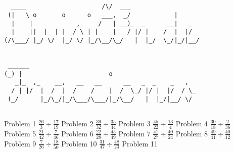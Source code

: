 \documentclass{article}
\begin{document}
\begin{verbatim}


  ____                     /\/  ___
 (|   \ o       o      o   ___,  _/            |
  |    |            ,     /   | __)_  _      __|   _
 _|    ||  |  |_|  / \_| |    |   / |/ |    /  |  |/
(/\___/ |_/ \/  |_/ \/ |_/\__/\_/   |  |_/  \_/|_/|__/


 ______
(_) |                        o
   _|_  ,_    __,   __   __      __   _  _    _   ,
  / | |/  |  /  |  /    /    |  /  \_/ |/ |  |/  / \_
 (_/      |_/\_/|_/\___/\___/|_/\__/   |  |_/|__/ \/
 

\end{verbatim}

Problem 1
\newline
\hfill \break
$\displaystyle \frac{26}{3} \div \frac{17}{19}$
\newline
\hfill \break
Problem 2
\newline
\hfill \break
$\displaystyle \frac{39}{32} \div \frac{35}{44}$
\newline
\hfill \break
Problem 3
\newline
\hfill \break
$\displaystyle \frac{45}{22} \div \frac{13}{4}$
\newline
\hfill \break
Problem 4
\newline
\hfill \break
$\displaystyle \frac{30}{18} \div \frac{2}{36}$
\newline
\hfill \break
Problem 5
\newline
\hfill \break
$\displaystyle \frac{21}{42} \div \frac{7}{46}$
\newline
\hfill \break
Problem 6
\newline
\hfill \break
$\displaystyle \frac{22}{28} \div \frac{45}{49}$
\newline
\hfill \break
Problem 7
\newline
\hfill \break
$\displaystyle \frac{41}{27} \div \frac{40}{24}$
\newline
\hfill \break
Problem 8
\newline
\hfill \break
$\displaystyle \frac{49}{41} \div \frac{40}{12}$
\newline
\hfill \break
Problem 9
\newline
\hfill \break
$\displaystyle \frac{7}{26} \div \frac{18}{50}$
\newline
\hfill \break
Problem 10
\newline
\hfill \break
$\displaystyle \frac{31}{47} \div \frac{48}{23}$
\newline
\hfill \break
Problem 11
\newline
\end{document}
